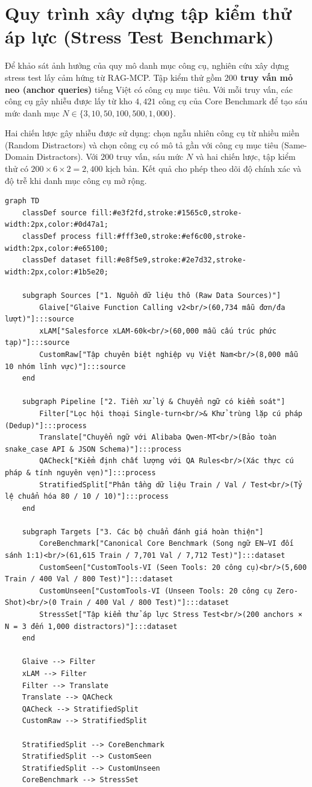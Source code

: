 \section{Quy trình xây dựng tập kiểm thử áp lực (Stress Test Benchmark)}
Để khảo sát ảnh hưởng của quy mô danh mục công cụ, nghiên cứu xây dựng stress test lấy cảm hứng từ RAG-MCP. Tập kiểm thử gồm \textbf{$200$ truy vấn mỏ neo (anchor queries)} tiếng Việt có công cụ mục tiêu. Với mỗi truy vấn, các công cụ gây nhiễu được lấy từ kho $4{,}421$ công cụ của Core Benchmark để tạo sáu mức danh mục $N \in \{3, 10, 50, 100, 500, 1{,}000\}$.

Hai chiến lược gây nhiễu được sử dụng: chọn ngẫu nhiên công cụ từ nhiều miền (Random Distractors) và chọn công cụ có mô tả gần với công cụ mục tiêu (Same-Domain Distractors). Với $200$ truy vấn, sáu mức $N$ và hai chiến lược, tập kiểm thử có $200 \times 6 \times 2 = 2{,}400$ kịch bản. Kết quả cho phép theo dõi độ chính xác và độ trễ khi danh mục công cụ mở rộng.

\begin{verbatim}
graph TD
    classDef source fill:#e3f2fd,stroke:#1565c0,stroke-width:2px,color:#0d47a1;
    classDef process fill:#fff3e0,stroke:#ef6c00,stroke-width:2px,color:#e65100;
    classDef dataset fill:#e8f5e9,stroke:#2e7d32,stroke-width:2px,color:#1b5e20;

    subgraph Sources ["1. Nguồn dữ liệu thô (Raw Data Sources)"]
        Glaive["Glaive Function Calling v2<br/>(60,734 mẫu đơn/đa lượt)"]:::source
        xLAM["Salesforce xLAM-60k<br/>(60,000 mẫu cấu trúc phức tạp)"]:::source
        CustomRaw["Tập chuyên biệt nghiệp vụ Việt Nam<br/>(8,000 mẫu 10 nhóm lĩnh vực)"]:::source
    end

    subgraph Pipeline ["2. Tiền xử lý & Chuyển ngữ có kiểm soát"]
        Filter["Lọc hội thoại Single-turn<br/>& Khử trùng lặp cú pháp (Dedup)"]:::process
        Translate["Chuyển ngữ với Alibaba Qwen-MT<br/>(Bảo toàn snake_case API & JSON Schema)"]:::process
        QACheck["Kiểm định chất lượng với QA Rules<br/>(Xác thực cú pháp & tính nguyên vẹn)"]:::process
        StratifiedSplit["Phân tầng dữ liệu Train / Val / Test<br/>(Tỷ lệ chuẩn hóa 80 / 10 / 10)"]:::process
    end

    subgraph Targets ["3. Các bộ chuẩn đánh giá hoàn thiện"]
        CoreBenchmark["Canonical Core Benchmark (Song ngữ EN–VI đối sánh 1:1)<br/>(61,615 Train / 7,701 Val / 7,712 Test)"]:::dataset
        CustomSeen["CustomTools-VI (Seen Tools: 20 công cụ)<br/>(5,600 Train / 400 Val / 800 Test)"]:::dataset
        CustomUnseen["CustomTools-VI (Unseen Tools: 20 công cụ Zero-Shot)<br/>(0 Train / 400 Val / 800 Test)"]:::dataset
        StressSet["Tập kiểm thử áp lực Stress Test<br/>(200 anchors × N = 3 đến 1,000 distractors)"]:::dataset
    end

    Glaive --> Filter
    xLAM --> Filter
    Filter --> Translate
    Translate --> QACheck
    QACheck --> StratifiedSplit
    CustomRaw --> StratifiedSplit

    StratifiedSplit --> CoreBenchmark
    StratifiedSplit --> CustomSeen
    StratifiedSplit --> CustomUnseen
    CoreBenchmark --> StressSet
\end{verbatim}

